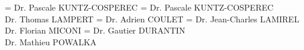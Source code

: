 \documentclass[11pt]{template/thesul}
\begin{document}




	\ThesisUL

	\President={
		Dr. Pascale KUNTZ-COSPEREC
	}
	\Rapporteurs={
		Dr. Pascale KUNTZ-COSPEREC\\
		Dr. Thomas LAMPERT
	}
	\Examinateurs={
		Dr. Adrien COULET
	}
	\Encadrants={
		Dr. Jean-Charles LAMIREL\\
		Dr. Florian MICONI
	}
	\Invites={
		Dr. Gautier DURANTIN\\
		Dr. Mathieu POWALKA
	}

	\MakeThesisTitlePage



	



	


\end{document}
